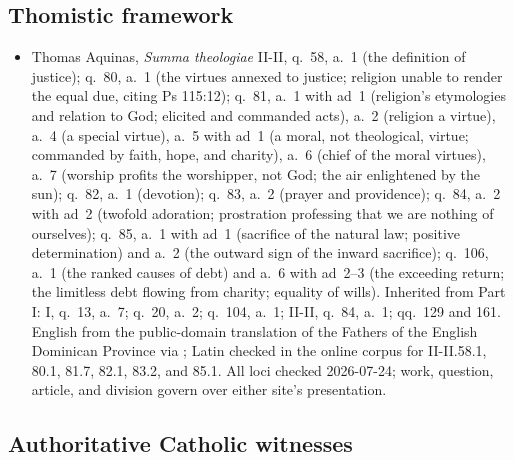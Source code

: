 \subsection*{Thomistic framework}

{\fontsize{8.6}{9.6}\selectfont
\begin{itemize}[itemsep=0pt,parsep=0pt,topsep=0.05em]
\item Thomas Aquinas, \emph{Summa theologiae} II-II, q.~58, a.~1 (the definition of justice); q.~80, a.~1 (the virtues annexed to justice; religion unable to render the equal due, citing Ps 115:12); q.~81, a.~1 with ad~1 (religion's etymologies and relation to God; elicited and commanded acts), a.~2 (religion a virtue), a.~4 (a special virtue), a.~5 with ad~1 (a moral, not theological, virtue; commanded by faith, hope, and charity), a.~6 (chief of the moral virtues), a.~7 (worship profits the worshipper, not God; the air enlightened by the sun); q.~82, a.~1 (devotion); q.~83, a.~2 (prayer and providence); q.~84, a.~2 with ad~2 (twofold adoration; prostration professing that we are nothing of ourselves); q.~85, a.~1 with ad~1 (sacrifice of the natural law; positive determination) and a.~2 (the outward sign of the inward sacrifice); q.~106, a.~1 (the ranked causes of debt) and a.~6 with ad~2--3 (the exceeding return; the limitless debt flowing from charity; equality of wills). Inherited from Part I: I, q.~13, a.~7; q.~20, a.~2; q.~104, a.~1; II-II, q.~84, a.~1; qq.~129 and 161. English from the public-domain translation of the Fathers of the English Dominican Province via ; Latin checked in the  online corpus for II-II.58.1, 80.1, 81.7, 82.1, 83.2, and 85.1. All loci checked 2026-07-24; work, question, article, and division govern over either site's presentation.
\end{itemize}}

\subsection*{Authoritative Catholic witnesses}


